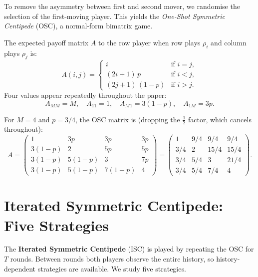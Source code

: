 \documentclass[12pt,a4paper]{article}
\begin{document}
To remove the asymmetry between first and second mover, we randomise the
selection of the first-moving player.  This yields the \emph{One-Shot Symmetric
Centipede} (OSC), a normal-form bimatrix game.

The expected payoff matrix $A$ to the row player when row plays $\rho_i$ and
column plays $\rho_j$ is:
\begin{equation}\label{eq:A}
  A(i,j) = \begin{cases}
    i                    & \text{if } i=j, \\
    (2i+1)\,p            & \text{if } i<j, \\
    (2j+1)\,(1-p)        & \text{if } i>j.
  \end{cases}
\end{equation}
Four values appear repeatedly throughout the paper:
\begin{equation}\label{eq:keyA}
  A_{MM} = M, \quad
  A_{11} = 1, \quad
  A_{M1} = 3(1-p), \quad
  A_{1M} = 3p.
\end{equation}

For $M=4$ and $p=3/4$, the OSC matrix is (dropping the $\tfrac{1}{2}$ factor,
which cancels throughout):
\[
A = \begin{pmatrix}
1 & 3p & 3p & 3p \\
3(1-p) & 2 & 5p & 5p \\
3(1-p) & 5(1-p) & 3 & 7p \\
3(1-p) & 5(1-p) & 7(1-p) & 4
\end{pmatrix}
=
\begin{pmatrix}
1 & 9/4 & 9/4 & 9/4 \\
3/4 & 2 & 15/4 & 15/4 \\
3/4 & 5/4 & 3 & 21/4 \\
3/4 & 5/4 & 7/4 & 4
\end{pmatrix}.
\]

\section{Iterated Symmetric Centipede: Five Strategies}
\label{sec:ISC}

The \textbf{Iterated Symmetric Centipede} (ISC) is played by repeating the OSC
for $T$ rounds.  Between rounds both players observe the entire history, so
history-dependent strategies are available.  We study five strategies.
\end{document}
